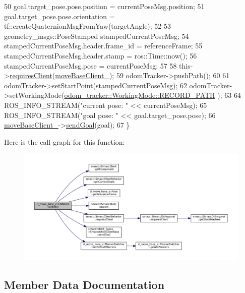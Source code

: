 \begin{DoxyCode}
50     goal.target\_pose.pose.position = currentPoseMsg.position;
51     goal.target\_pose.pose.orientation = tf::createQuaternionMsgFromYaw(targetAngle);
52 
53     geometry\_msgs::PoseStamped stampedCurrentPoseMsg;
54     stampedCurrentPoseMsg.header.frame\_id = referenceFrame;
55     stampedCurrentPoseMsg.header.stamp = ros::Time::now();
56     stampedCurrentPoseMsg.pose = currentPoseMsg;
57 
58     this->\hyperlink{classsmacc_1_1SmaccClientBehavior_a917f001e763a1059af337bf4e164f542}{requiresClient}(\hyperlink{classcl__move__base__z_1_1CbRotate_a390623f5bcbdad18fe2a65428e4621cb}{moveBaseClient\_});
59     odomTracker->pushPath();
60 
61     odomTracker->setStartPoint(stampedCurrentPoseMsg);
62     odomTracker->setWorkingMode(\hyperlink{namespacecl__move__base__z_1_1odom__tracker_ac46b05813b2791604f6cd0a39ace3ef8a023bc3adf68871ef7a0c616765ac80a7}{odom\_tracker::WorkingMode::RECORD\_PATH}
      );
63 
64     ROS\_INFO\_STREAM(\textcolor{stringliteral}{"current pose: "} << currentPoseMsg);
65     ROS\_INFO\_STREAM(\textcolor{stringliteral}{"goal pose: "} << goal.target\_pose.pose);
66     \hyperlink{classcl__move__base__z_1_1CbRotate_a390623f5bcbdad18fe2a65428e4621cb}{moveBaseClient\_}->\hyperlink{classsmacc_1_1client__bases_1_1SmaccActionClientBase_a9c47a5094ac8afb01680307fe5eca922}{sendGoal}(goal);
67 \}
\end{DoxyCode}


Here is the call graph for this function\+:
\nopagebreak
\begin{figure}[H]
\begin{center}
\leavevmode
\includegraphics[width=350pt]{classcl__move__base__z_1_1CbRotate_a316ee51ecfd3f10fd1edae0d7d3b26c0_cgraph}
\end{center}
\end{figure}




\subsection{Member Data Documentation}
